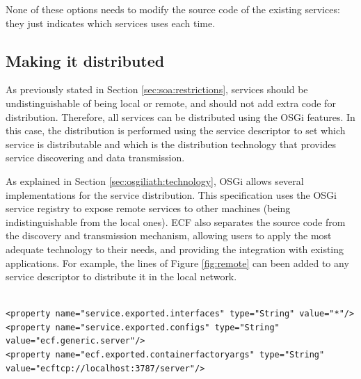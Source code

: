 None of these options needs to modify the source code of the existing
services: they just indicates which services uses each time.

\subsection{Making it distributed}
\label{sec:osgiliath:distributed}

As previously stated in Section \ref{sec:soa:restrictions}, services should be undistinguishable of being local or remote, and should not add extra code for distribution. Therefore, all services
can be distributed using the OSGi features. In this case, the
distribution is performed using the service descriptor to set which
service is distributable and which is the distribution technology that
provides service discovering and data transmission. 

As explained in Section \ref{sec:osgiliath:technology}, %
 OSGi allows several implementations for the service
 distribution. 
 This specification uses the OSGi service registry to expose remote services to other machines (being indistinguishable from the local ones).  ECF also separates the source code from the discovery and transmission mechanism, allowing users to apply the most adequate technology to their needs, and providing the integration with existing applications. For example, the lines of Figure \ref{fig:remote} can been added to any service descriptor to distribute it in the local network.

 





\newsavebox{\mintedboxServer}
\begin{lrbox}{\mintedboxServer}
\begin{minipage}{10cm}
\begin{verbatim}

<property name="service.exported.interfaces" type="String" value="*"/>
<property name="service.exported.configs" type="String" 
value="ecf.generic.server"/>
<property name="ecf.exported.containerfactoryargs" type="String" 
value="ecftcp://localhost:3787/server"/>
\end{verbatim}
\end{minipage}
\end{lrbox}

